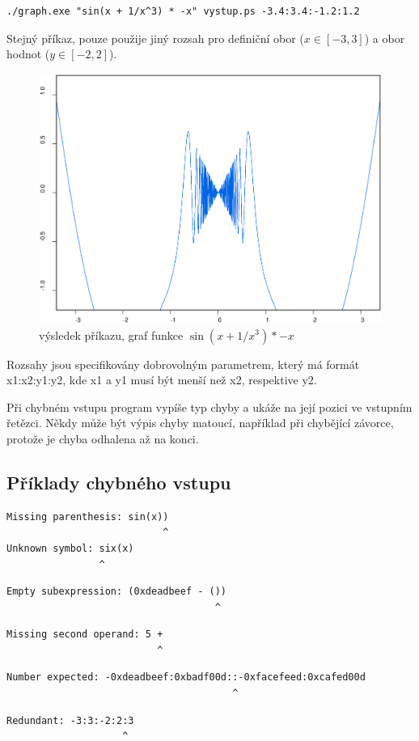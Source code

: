 \documentclass[11pt]{article}
\begin{document}
\begin{verbatim}
./graph.exe "sin(x + 1/x^3) * -x" vystup.ps -3.4:3.4:-1.2:1.2
\end{verbatim}
Stejný příkaz, pouze použije jiný rozsah pro definiční obor ($x \in [-3, 3]$) a
obor hodnot ($y \in [-2, 2]$).
\begin{figure}[ht!]
\centering
	\includegraphics[width=13cm]{figures/test2.eps}
	\caption{výsledek příkazu, graf funkce $\sin \left(x + 1/x^3 \right) * -x$}
\end{figure}


Rozsahy jsou specifikovány dobrovolným parametrem, který má formát
x1:x2:y1:y2, kde x1 a y1 musí být menší než x2, respektive y2. 

Při chybném vstupu program vypíše typ chyby a ukáže na její pozici ve vstupním
řetězci. Někdy může být výpis chyby matoucí, například při chybějící závorce,
protože je chyba odhalena až na konci.

\subsection{Příklady chybného vstupu}
\begin{verbatim}
Missing parenthesis: sin(x))
                           ^
Unknown symbol: six(x)
                ^
\end{verbatim}
\begin{verbatim}
Empty subexpression: (0xdeadbeef - ())
                                    ^
\end{verbatim}
\begin{verbatim}
Missing second operand: 5 +
                          ^
\end{verbatim}
\begin{verbatim}
Number expected: -0xdeadbeef:0xbadf00d::-0xfacefeed:0xcafed00d
                                       ^
\end{verbatim}
\begin{verbatim}
Redundant: -3:3:-2:2:3
                    ^
\end{verbatim}
\end{document}
